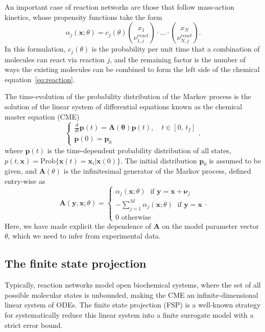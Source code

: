 \documentclass[1p]{article}
\def\bA{\bm{A}}
\def\bx{\bm{x}}
\begin{document}
An important case of reaction networks are those that follow mass-action kinetics, whose propensity functions take the form
\begin{equation}
\label{eq:propensity_mass_action}
\alpha_j(\bm{x}; \theta)
=
c_j(\theta)
\binom{x_1}{\nu_{1,j}^{react}} \cdot \ldots \cdot \binom{x_N}{\nu_{N,j}^{react}}.
\end{equation}
In this formulation, $c_j(\theta)$ is the probability per unit time that a combination of molecules can react via reaction $j$, and the remaining factor is the number of ways the existing molecules can be combined to form the left side of the chemical equation~\eqref{eq:reaction}.

 The time-evolution of the probability distribution of the Markov process is the solution of the linear system of differential equations known as the chemical master equation (CME)
\begin{equation}
\label{eq:cme_ode_form}
\begin{cases}
\frac{d}{dt}\bm{p}(t)=\bm{A(\theta)}\bm{p}(t),\quad t\in[0,\,t_f]\\
\bm{p}(0)=\bm{p}_0
\end{cases},
\end{equation}
where $\bm{p}(t)$ is the time-dependent probability distribution of all states, $p(t, \bx)=\textrm{Prob}\{\bm{x}(t)=\bm{x}_i \vert \bm{x}(0)\}$.
The initial distribution $\bm{p}_0$ is assumed to be given, and $\bm{A}(\theta)$ is the infinitesimal generator of the Markov process, defined entry-wise as
\begin{equation}
  \label{eq:cme_matrix}
  \bm{A}(\bm{y}, \bm{x}; \theta)
  =
  \begin{cases}
    \alpha_j(\bm{x}; \theta) \; \text{ if } \bm{y} = \bm{x} + \bm{\nu}_j \\
    -\sum_{j=1}^{M}{\alpha_j(\bm{x}; \theta)} \; \text{ if } \bm{y} = \bm{x} \\
    0 \text{ otherwise}
  \end{cases}.
\end{equation}
Here, we have made explicit the dependence of $\bA$ on the model parameter vector $\theta$, which we need to infer from experimental data.
\subsection{The finite state projection}
\label{sec:fsp_background}
Typically, reaction networks model open biochemical systems, where the set of all possible molecular states is unbounded, making the CME an infinite-dimensional linear system of ODEs.
The finite state projection (FSP) is a well-known strategy for systematically reduce this linear system into a finite surrogate model with a strict error bound.
%
\end{document}
